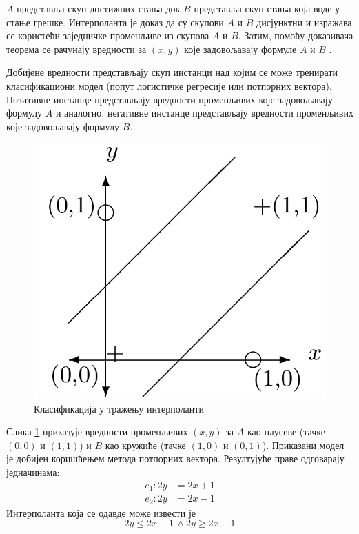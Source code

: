 \documentclass[a4paper]{article}
\begin{document}
{$A$ представља скуп достижних стања док $B$ представља скуп стања која воде у стање грешке. Интерполанта је доказ да су
скупови $A$ и $B$ дисјунктни и изражава се користећи заједничке променљиве из скупова $A$ и $B$. Затим, помоћу доказивача теорема се рачунају вредности за $(x, y)$ које задовољавају формуле $A$ и $B$ \cite{Sharma_interpolantsas}.

Добијене вредности представљају скуп инстанци над којим се може тренирати класификациони модел (попут логистичке регресије или потпорних вектора).
Позитивне инстанце представљају вредности променљивих које задовољавају формулу $A$ и аналогно, негативне инстанце представљају вредности
променљивих које задовољавају формулу $B$.

\begin{figure}[h!]
\begin{center}
\includegraphics[scale=0.15]{./slike/interpolant.png}
\end{center}
\caption{Класификација у тражењу интерполанти}
\label{fig:interpolant_svm}
\end{figure}

Слика \ref{fig:interpolant_svm} приказује вредности променљивих $(x, y)$ за $A$ као плусеве (тачке $(0, 0)$ и $(1, 1)$)
и $B$ као кружиће (тачке $(1, 0)$ и $(0, 1)$). Приказани модел је добијен коришћењем метода потпорних вектора. Резултујуће праве одговарају једначинама:
\begin{equation*}
\begin{split}
    e_1: 2y &= 2x + 1 \\
    e_2: 2y &= 2x - 1
\end{split}
\end{equation*}
Интерполанта која се одавде може извести је
\begin{equation*}
2y \leq 2x + 1 \, \land 2y \geq 2x - 1
\end{equation*}

}
\end{document}
